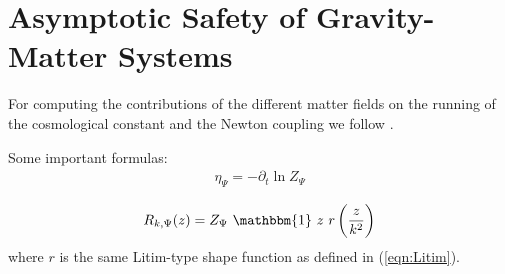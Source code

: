\chapter{Asymptotic Safety of Gravity-Matter Systems}\label{chap:Matter}
For computing the contributions of the different matter fields on the running of the cosmological constant and the Newton coupling we follow \cite{DonaEichhornPercacci2013}. 


Some important formulas:
\begin{align}
	\eta_{\Psi} = -\partial_t \ln Z_{\Psi}
\end{align}

\begin{align}
	R_{k, \Psi}(z) = Z_{\Psi} \ \mathbbm{1} \ z \ r\left(\frac{z}{k^2}\right)
\end{align}
where $r$ is the same Litim-type shape function as defined in (\ref{eqn:Litim}).
